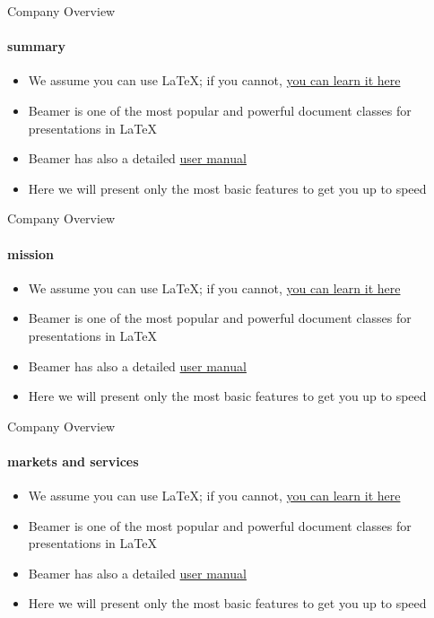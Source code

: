 \documentclass{beamer}
\newcommand{\hrefcol}[2]{\textcolor{cyan}{\href{#1}{#2}}}
\begin{document}
\begin{frame}{Company Overview}
\framesubtitle{summary}
\begin{itemize}
\item We assume you can use \LaTeX; if you cannot,
\hrefcol{http://en.wikibooks.org/wiki/LaTeX/}{you can learn it here}
\item Beamer is one of the most popular and powerful document
classes for presentations in \LaTeX
\item Beamer has also a detailed
\hrefcol{http://www.ctan.org/tex-archive/macros/latex/contrib/beamer/doc/beameruserguide.pdf}{user
 manual}
\item Here we will present only the most basic features to get you up to speed
\end{itemize}
\end{frame}

\begin{frame}{Company Overview}
\framesubtitle{mission}
\begin{itemize}
\item We assume you can use \LaTeX; if you cannot,
\hrefcol{http://en.wikibooks.org/wiki/LaTeX/}{you can learn it here}
\item Beamer is one of the most popular and powerful document
classes for presentations in \LaTeX
\item Beamer has also a detailed
\hrefcol{http://www.ctan.org/tex-archive/macros/latex/contrib/beamer/doc/beameruserguide.pdf}{user
 manual}
\item Here we will present only the most basic features to get you up to speed
\end{itemize}
\end{frame}

\begin{frame}{Company Overview}
\framesubtitle{markets and services}
\begin{itemize}
\item We assume you can use \LaTeX; if you cannot,
\hrefcol{http://en.wikibooks.org/wiki/LaTeX/}{you can learn it here}
\item Beamer is one of the most popular and powerful document
classes for presentations in \LaTeX
\item Beamer has also a detailed
\hrefcol{http://www.ctan.org/tex-archive/macros/latex/contrib/beamer/doc/beameruserguide.pdf}{user
 manual}
\item Here we will present only the most basic features to get you up to speed
\end{itemize}
\end{frame}
\end{document}
